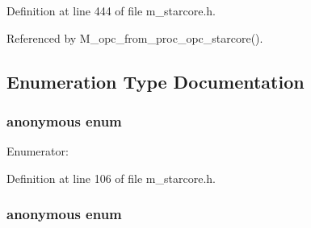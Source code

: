 Definition at line 444 of file m\_\-starcore.h.

Referenced by M\_\-opc\_\-from\_\-proc\_\-opc\_\-starcore().

\subsection{Enumeration Type Documentation}
\subsubsection{\setlength{\rightskip}{0pt plus 5cm}anonymous enum}\label{m__starcore_8h_05589fbab0657f08285ebdfe93f5ec9e}


\begin{Desc}
\item[Enumerator: ]\par
\begin{description}
\item[{\em 
M\_\-EM\_\-SC140\label{m__starcore_8h_05589fbab0657f08285ebdfe93f5ec9e496edea6a046b8eb2610eaf2d5b181d2}
}]\end{description}
\end{Desc}



Definition at line 106 of file m\_\-starcore.h.\subsubsection{\setlength{\rightskip}{0pt plus 5cm}anonymous enum}\label{m__starcore_8h_16af7b253440dadd46a80a4b9fddba4d}


